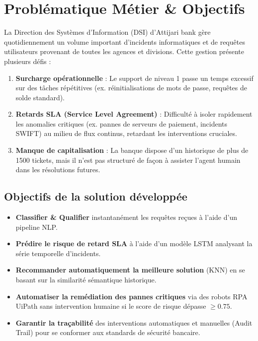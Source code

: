 \documentclass[11pt,a4paper]{article}
\begin{document}
\section{Problématique Métier \& Objectifs}

La Direction des Systèmes d'Information (DSI) d'Attijari bank gère quotidiennement un volume important d'incidents informatiques et de requêtes utilisateurs provenant de toutes les agences et divisions. Cette gestion présente plusieurs défis :
\begin{enumerate}
    \item \textbf{Surcharge opérationnelle} : Le support de niveau 1 passe un temps excessif sur des tâches répétitives (ex. réinitialisations de mots de passe, requêtes de solde standard).
    \item \textbf{Retards SLA (Service Level Agreement)} : Difficulté à isoler rapidement les anomalies critiques (ex. pannes de serveurs de paiement, incidents SWIFT) au milieu de flux continus, retardant les interventions cruciales.
    \item \textbf{Manque de capitalisation} : La banque dispose d'un historique de plus de 1500 tickets, mais il n'est pas structuré de façon à assister l'agent humain dans les résolutions futures.
\end{enumerate}

\subsection{Objectifs de la solution développée}
\begin{itemize}
    \item \textbf{Classifier \& Qualifier} instantanément les requêtes reçues à l'aide d'un pipeline NLP.
    \item \textbf{Prédire le risque de retard SLA} à l'aide d'un modèle LSTM analysant la série temporelle d'incidents.
    \item \textbf{Recommander automatiquement la meilleure solution} (KNN) en se basant sur la similarité sémantique historique.
    \item \textbf{Automatiser la remédiation des pannes critiques} via des robots RPA UiPath sans intervention humaine si le score de risque dépasse $\ge 0.75$.
    \item \textbf{Garantir la traçabilité} des interventions automatiques et manuelles (Audit Trail) pour se conformer aux standards de sécurité bancaire.
\end{itemize}
\end{document}
